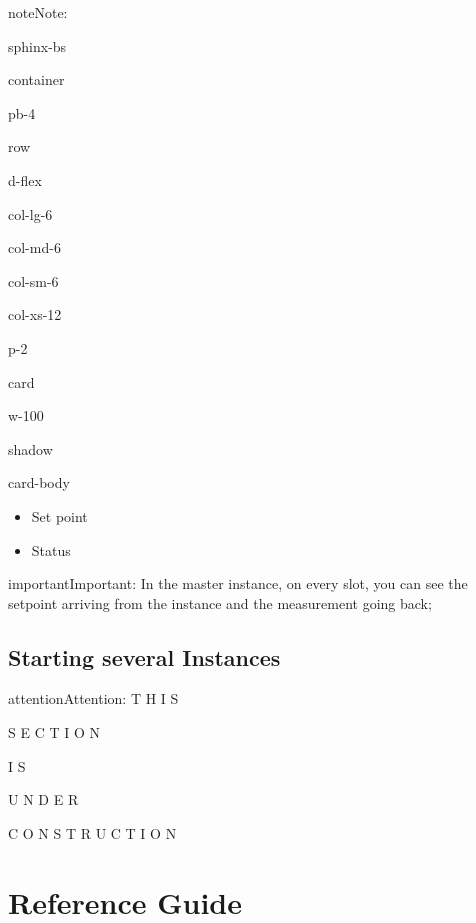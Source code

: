 \documentclass[letterpaper,10pt,english]{jupyterBook}
\begin{document}
\begin{sphinxadmonition}{note}{Note:}
\begin{sphinxuseclass}{sphinx-bs}
\begin{sphinxuseclass}{container}
\begin{sphinxuseclass}{pb-4}
\begin{sphinxuseclass}{row}
\begin{sphinxuseclass}{d-flex}
\begin{sphinxuseclass}{col-lg-6}
\begin{sphinxuseclass}{col-md-6}
\begin{sphinxuseclass}{col-sm-6}
\begin{sphinxuseclass}{col-xs-12}
\begin{sphinxuseclass}{p-2}
\begin{sphinxuseclass}{card}
\begin{sphinxuseclass}{w-100}
\begin{sphinxuseclass}{shadow}
\begin{sphinxuseclass}{card-body}
\begin{itemize}
\item {} 
\sphinxAtStartPar
Set point

\item {} 
\sphinxAtStartPar
Status

\end{itemize}

\end{sphinxuseclass}
\end{sphinxuseclass}
\end{sphinxuseclass}
\end{sphinxuseclass}
\end{sphinxuseclass}
\end{sphinxuseclass}
\end{sphinxuseclass}
\end{sphinxuseclass}
\end{sphinxuseclass}
\end{sphinxuseclass}
\end{sphinxuseclass}
\end{sphinxuseclass}
\end{sphinxuseclass}
\end{sphinxuseclass}\end{sphinxadmonition}

\begin{sphinxadmonition}{important}{Important:}
\sphinxAtStartPar
In the master instance, on every slot, you can see the setpoint arriving from the instance and the measurement going back;
\end{sphinxadmonition}


\chapter{Starting several Instances}
\label{\detokenize{07_Starting_Several_instance:starting-several-instances}}\label{\detokenize{07_Starting_Several_instance::doc}}
\begin{sphinxadmonition}{attention}{Attention:}
\sphinxAtStartPar
T H I S

\sphinxAtStartPar
S E C T I O N

\sphinxAtStartPar
I S

\sphinxAtStartPar
U N D E R

\sphinxAtStartPar
C O N S T R U C T I O N
\end{sphinxadmonition}


\part{Reference Guide}
\end{document}

